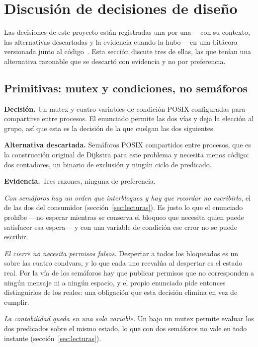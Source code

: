 \section{Discusión de decisiones de diseño}
\label{sec:decisiones}

Las decisiones de este proyecto están registradas una por una ---con su
contexto, las alternativas descartadas y la evidencia cuando la hubo--- en
una bitácora versionada junto al código~\cite{Bitacora2026}. Esta sección
discute tres de ellas, las que tenían una alternativa razonable que se
descartó con evidencia y no por preferencia.

\subsection{Primitivas: mutex y condiciones, no semáforos}

\textbf{Decisión.} Un mutex y cuatro variables de condición POSIX
configuradas para compartirse entre procesos. El enunciado permite las dos
vías y deja la elección al grupo, así que esta es la decisión de la que
cuelgan las dos siguientes.

\textbf{Alternativa descartada.} Semáforos POSIX compartidos entre procesos,
que es la construcción original de Dijkstra para este problema y necesita
menos código: dos contadores, un binario de exclusión y ningún ciclo de
predicado.

\textbf{Evidencia.} Tres razones, ninguna de preferencia.

\emph{Con semáforos hay un orden que interbloquea y hay que recordar no
escribirlo}, el de las dos  del consumidor
(sección~\ref{sec:lecturas}). Es justo lo que el enunciado prohíbe ---no
esperar mientras se conserva el bloqueo que necesita quien puede satisfacer
esa espera--- y con una variable de condición ese error no se puede
escribir.

\emph{El cierre no necesita permisos falsos.} Despertar a todos los
bloqueados es un  sobre las cuatro condvars, y lo que cada
uno reevalúa al despertar es el estado real. Por la vía de los semáforos hay
que publicar permisos que no corresponden a ningún mensaje ni a ningún
espacio, y el propio enunciado pide entonces distinguirlos de los reales:
una obligación que esta decisión elimina en vez de cumplir.

\emph{La contabilidad queda en una sola variable.} Un  bajo un
mutex permite evaluar los dos predicados sobre el mismo estado, lo que con
dos semáforos no vale en todo instante (sección~\ref{sec:lecturas}).

